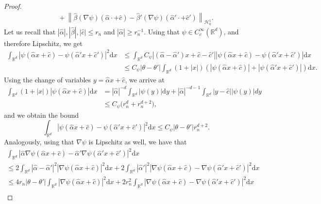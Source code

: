 \documentclass[11pt,a4paper,reqno]{amsart}
\numberwithin{equation}{section}
\theoremstyle{plain}
\theoremstyle{definition}
\def\ud{\mathrm d}
\newcommand{\cH}{\mathcal{H}}
\newcommand{\R}{\mathbb{R}}
\newcommand{\norm}[1]{\left\|#1 \right\|} %
\newcommand{\abs}[1]{\left|#1\right|} %
\begin{document}
\begin{proof}
\begin{align}
    &\qquad + \norm{\hat\beta \left( \nabla \psi \right) \left( \hat\alpha \cdot + \hat c \right)-\hat\beta' \left( \nabla \psi \right) \left( \hat\alpha' \cdot + \hat c' \right)}_{\cH_0^1}.
\end{align}
Let us recall that $\abs{\hat \alpha}, |\hat\beta|,\abs{\hat c}\le r_n$ and $\abs{\hat \alpha}\ge r_n^{-1}$. 
Using that $\psi \in C_c^{\infty} \left( \mathbb{R}^d \right)$, and therefore Lipschitz, we get
\begin{align*}
\int_{\R^d} \abs{\psi \left( \hat\alpha x + \hat c \right)-\psi \left( \hat\alpha' x + \hat c'\right)}^2\ud x 
    & \le \int_{\R^d} C_\psi \abs{\left(\hat\alpha - \hat \alpha' \right) x + \hat c - \hat c'} \abs{\psi \left( \hat\alpha x + \hat c \right) - \psi \left( \hat\alpha' x + \hat c'\right)} \ud x \\
    & \le C_\psi \abs{\theta-\theta'} \int_{\R^d} \left( 1 + \abs{x} \right) \left( \abs{\psi \left( \hat\alpha x + \hat c \right)}+ \abs{\psi \left( \hat\alpha' x + \hat c'\right)} \right) \ud x.
\end{align*}
Using the change of variables $y = \hat \alpha x + \hat c$, we arrive at
\begin{align*}
    \int_{\R^d} \left( 1 + \abs{x} \right) \abs{\psi \left( \hat\alpha x + \hat c \right)} \ud x & = \abs{\hat \alpha}^{-d} \int_{\R^d} \abs{\psi (y)} \ud y + \abs{\hat \alpha}^{-d-1} \int_{\R^d} \abs{y - \hat c} \abs{\psi \left( y \right)} dy \\
    & \le C_\psi \Big( r_n^{d} + r_n^{d+2} \Big),
\end{align*}
and we obtain the bound
\[
    \int_{\R^d} \abs{\psi \left( \hat\alpha x + \hat c \right)-\psi \left( \hat\alpha' x + \hat c'\right)}^2\ud x \leq C_\psi \abs{\theta-\theta'} r_n^{d+2}.
\]
Analogously, using that $\nabla \psi$ is Lipschitz as well, we have that
\begin{multline*}
\int_{\R^d} \abs{\hat \alpha\nabla\psi\left( \hat\alpha x + \hat c \right)-\hat \alpha'\nabla\psi \left( \hat\alpha' x + \hat c'\right)}^2\ud x \\
     \le 2\int_{\R^d} \abs{\hat\alpha-\hat \alpha'}^2\abs{\nabla\psi \left( \hat\alpha x + \hat c \right)}^2\ud x + 2\int_{\R^d}\abs{\hat \alpha'}^2\abs{\nabla\psi \left( \hat\alpha x + \hat c \right)-\nabla\psi \left( \hat\alpha' x + \hat c'\right)}^2\ud x \\
      \le 4 r_n \abs{\theta - \theta'} \int_{\R^d} \abs{\nabla\psi \left( \hat\alpha x + \hat c \right)}^2\ud x + 2 r_n^2 \int_{\R^d} \abs{\nabla\psi \left( \hat\alpha x + \hat c \right)-\nabla\psi \left( \hat\alpha' x + \hat c'\right)}^2\ud x \\

\end{multline*}
\end{proof}
\end{document}
